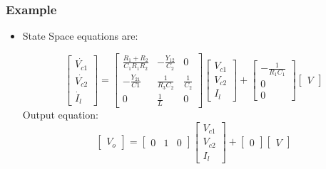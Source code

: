 \documentclass{beamer}
\begin{document}
\begin{frame}
\frametitle{Example}
\begin{small}
\begin{itemize}
\item State Space equations are:

\[ \left[ \begin{array}{cc}
\dot{V_{c1}} \\ \dot{V_{c2}} \\ \dot{I_l}
\end{array} \right]
=
\left[ \begin{array}{ccc}
\frac{R_1+R_2}{C_1R_1R_2} & -\frac{Y_{12}}{C_2} & 0\\
-\frac{Y_21}{C1} & \frac{1}{R_3C_2} & \frac{1}{C_2}\\
0 & \frac{1}{L}& 0
\end{array} \right]
%
\left[ \begin{array}{c}
{V_{c1}} \\
{V_{c2}} \\
{I_l}
\end{array} \right]
+
\left[ \begin{array}{c}
-\frac{1}{R_1C_1} \\
0 \\
0
\end{array} \right]
%
\left[ \begin{array}{c}
{V}
\end{array} \right]
\]
Output equation:
\[ \left[ \begin{array}{c}
{V_o} 
\end{array} \right]
=
\left[ \begin{array}{ccc}
0 & 1 & 0
\end{array} \right]
%
\left[ \begin{array}{cc}
{V_{c1}} \\
{V_{c2}}\\
{I_l}
\end{array} \right]
+
\left[ \begin{array}{cc}
0
\end{array} \right]
%
\left[ \begin{array}{cc}
{V}
\end{array} \right]
\]

\end{itemize}
\end{small}
\end{frame}
\end{document}
